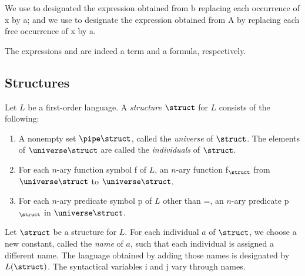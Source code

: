 \begin{convention}
	We use  to designated the expression obtained from \synt b
	replacing each occurrence of \synt x by \synt a; and we use 
	to designate the expression obtained from \synt A by replacing each free occurrence of \synt x
	by \synt a.
\end{convention}

\begin{fact}
	The expressions  and 
	are indeed a term and a formula, respectively.
\end{fact}


\subsection{Structures}

\begin{definition}[Structure]
	Let $L$ be a first-order language. A \emph{structure} $\struct$ for $L$ consists of the following:
	\begin{enumerate}
		\item A nonempty set $\pipe\struct$, called the \emph{universe} of $\struct$.
		The elements of $\universe\struct$ are called the \emph{individuals} of $\struct$.
		\item For each $n$-ary function symbol \synt f of $L$, an $n$-ary function
		\synt f$_\struct$ from $\universe\struct$ to $\universe\struct$.
		\item For each $n$-ary predicate symbol \synt p of $L$ other than =,
		an $n$-ary predicate \synt p$_\struct$ in $\universe\struct$. 
	\end{enumerate}
\end{definition}

\begin{definition}
	Let $\struct$ be a structure for $L$. For each individual $a$ of $\struct$,
	we choose a new constant, called the \emph{name} of $a$, such that each individual
	is assigned a different name. The language obtained by adding those names is 
	designated by $L(\struct)$. The syntactical variables \synt i and \synt j vary
	through names.
\end{definition}

